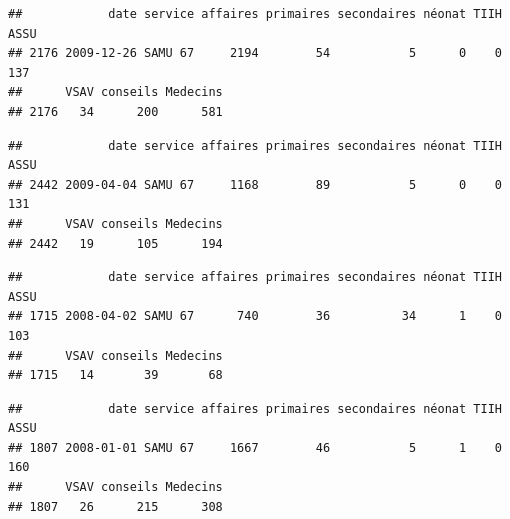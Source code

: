 \documentclass[]{article}
\newenvironment{Shaded}{\begin{snugshade}}{\end{snugshade}}
\newcommand{\KeywordTok}[1]{\textcolor[rgb]{0.13,0.29,0.53}{\textbf{{#1}}}}
\newcommand{\DataTypeTok}[1]{\textcolor[rgb]{0.13,0.29,0.53}{{#1}}}
\newcommand{\StringTok}[1]{\textcolor[rgb]{0.31,0.60,0.02}{{#1}}}
\newcommand{\NormalTok}[1]{{#1}}
\begin{document}
\begin{verbatim}
##            date service affaires primaires secondaires néonat TIIH ASSU
## 2176 2009-12-26 SAMU 67     2194        54           5      0    0  137
##      VSAV conseils Medecins
## 2176   34      200      581
\end{verbatim}

\begin{Shaded}
\end{Shaded}

\begin{verbatim}
##            date service affaires primaires secondaires néonat TIIH ASSU
## 2442 2009-04-04 SAMU 67     1168        89           5      0    0  131
##      VSAV conseils Medecins
## 2442   19      105      194
\end{verbatim}

\begin{Shaded}
\end{Shaded}

\begin{verbatim}
##            date service affaires primaires secondaires néonat TIIH ASSU
## 1715 2008-04-02 SAMU 67      740        36          34      1    0  103
##      VSAV conseils Medecins
## 1715   14       39       68
\end{verbatim}

\begin{Shaded}
\end{Shaded}

\begin{verbatim}
##            date service affaires primaires secondaires néonat TIIH ASSU
## 1807 2008-01-01 SAMU 67     1667        46           5      1    0  160
##      VSAV conseils Medecins
## 1807   26      215      308
\end{verbatim}
\end{document}
